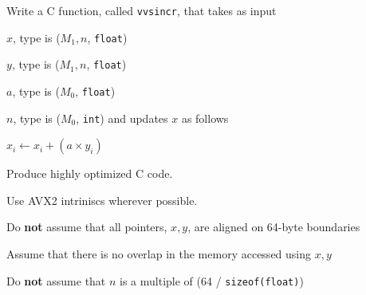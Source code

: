 \documentclass[letterpaper,12pt]{article}
\begin{document}



Write a C function, called {\tt vvsincr}, that takes as input
\be
\item \(x\), type is (\(M_1, n\), {\tt float})
\item \(y\), type is (\(M_1, n\), {\tt float})
\item \(a\), type is (\(M_0\), {\tt float})
\item \(n\), type is (\(M_0\), {\tt int})
\ee
and updates \(x\) as follows
\be
\item \(x_i \leftarrow x_i + (a \times y_i)\)
\ee

  \be
\item Produce highly optimized C code.
\item Use AVX2 intriniscs wherever possible.
\item Do {\bf not} assume that all pointers, \(x, y\), are aligned on 64-byte boundaries
\item Assume that there is no overlap in the memory accessed using \(x, y\)
\item Do {\bf not} assume that \(n\) is a multiple of 
  (64 / {\tt sizeof(float)})
  \ee
\end{document}
